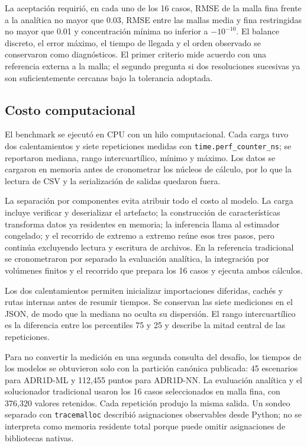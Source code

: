 \documentclass[11pt,a4paper]{article}
\newcommand{\code}[1]{\texttt{#1}}
\begin{document}
La aceptación requirió, en cada uno de los 16 casos, RMSE de la malla fina
frente a la analítica no mayor que 0.03, RMSE entre las mallas media y fina
restringidas no mayor que 0.01 y concentración mínima no inferior a
$-10^{-10}$. El balance discreto, el error máximo, el tiempo de llegada y el
orden observado se conservaron como diagnósticos. El primer criterio mide
acuerdo con una referencia externa a la malla; el segundo pregunta si dos
resoluciones sucesivas ya son suficientemente cercanas bajo la tolerancia
adoptada.

\subsection{Costo computacional}

El benchmark se ejecutó en CPU con un hilo computacional. Cada carga tuvo dos
calentamientos y siete repeticiones medidas con \code{time.perf\_counter\_ns};
se reportaron mediana, rango intercuartílico, mínimo y máximo. Los datos se
cargaron en memoria antes de cronometrar los núcleos de cálculo, por lo que la
lectura de CSV y la serialización de salidas quedaron fuera.

La separación por componentes evita atribuir todo el costo al modelo. La carga
incluye verificar y deserializar el artefacto; la construcción de
características transforma datos ya residentes en memoria; la inferencia llama
al estimador congelado; y el recorrido de extremo a extremo reúne esos tres
pasos, pero continúa excluyendo lectura y escritura de archivos. En la
referencia tradicional se cronometraron por separado la evaluación analítica,
la integración por volúmenes finitos y el recorrido que prepara los 16 casos y
ejecuta ambos cálculos.

Los dos calentamientos permiten inicializar importaciones diferidas, cachés y
rutas internas antes de resumir tiempos. Se conservan las siete mediciones en
el JSON, de modo que la mediana no oculta su dispersión. El rango
intercuartílico es la diferencia entre los percentiles 75 y 25 y describe la
mitad central de las repeticiones.

Para no convertir la medición en una segunda consulta del desafío, los tiempos
de los modelos se obtuvieron solo con la partición canónica publicada: 45
escenarios para ADR1D-ML y 112,455 puntos para ADR1D-NN. La evaluación analítica
y el solucionador tradicional usaron los 16 casos seleccionados en malla fina,
con 376,320 valores retenidos. Cada repetición produjo la misma salida. Un
sondeo separado con \code{tracemalloc} describió asignaciones observables desde
Python; no se interpreta como memoria residente total porque puede omitir
asignaciones de bibliotecas nativas.
\end{document}
